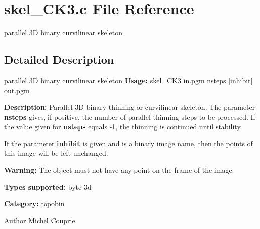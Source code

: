 \section{skel\_\-CK3.c File Reference}
\label{skel__CK3_8c}


parallel 3D binary curvilinear skeleton  




\subsection{Detailed Description}
parallel 3D binary curvilinear skeleton {\bfseries Usage:} skel\_\-CK3 in.pgm nsteps [inhibit] out.pgm

{\bfseries Description:} Parallel 3D binary thinning or curvilinear skeleton. The parameter {\bfseries nsteps} gives, if positive, the number of parallel thinning steps to be processed. If the value given for {\bfseries nsteps} equals -\/1, the thinning is continued until stability.

If the parameter {\bfseries inhibit} is given and is a binary image name, then the points of this image will be left unchanged.

{\bfseries Warning:} The object must not have any point on the frame of the image.

{\bfseries Types supported:} byte 3d

{\bfseries Category:} topobin

\begin{DoxyAuthor}{Author}
Michel Couprie 
\end{DoxyAuthor}
